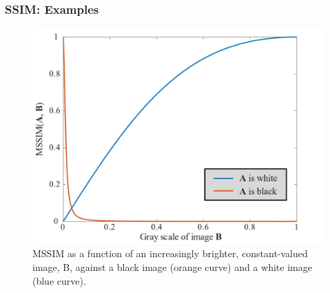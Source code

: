 \documentclass[13.5pt,aspecratio=169, xcolor=dvipsnames]{beamer}
\begin{document}
\begin{frame}
    \onehalfspacing
        \frametitle{SSIM: Examples}
        
        \begin{minipage}{0.6\textwidth}
            \begin{figure}
                \centering
                \includegraphics[width=\linewidth]{MSSIM_Fig_1.jpg}
                \captionsetup{labelformat=empty}
                \caption{{\tiny MSSIM as a function of an increasingly brighter, constant-valued
                image, B, against a black image (orange curve) and a white image (blue curve).}}
            \end{figure}
        \end{minipage}
        \begin{minipage}{0.39\textwidth}
            \begin{figure}
                \centering

\end{figure}
\end{minipage}
\end{frame}
\end{document}
